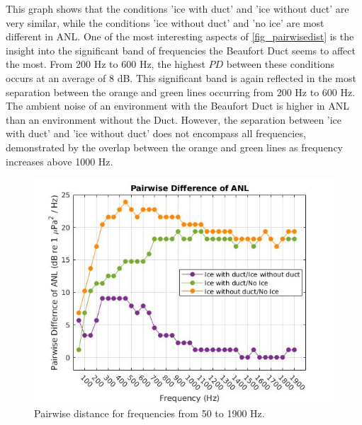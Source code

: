 This graph shows that the conditions 'ice with duct' and 'ice without duct' are very similar, while the conditions 'ice without duct' and 'no ice' are most different in ANL. One of the most interesting aspects of \autoref{fig_pairwisedist} is the insight into the significant band of frequencies the Beaufort Duct seems to affect the most. From 200 Hz to 600 Hz, the highest $PD$ between these conditions occurs at an average of 8 dB. This significant band is again reflected in the most separation between the orange and green lines occurring from 200 Hz to 600 Hz. The ambient noise of an environment with the Beaufort Duct is higher in ANL than an environment without the Duct. However, the separation between 'ice with duct' and 'ice without duct' does not encompass all frequencies, demonstrated by the overlap between the orange and green lines as frequency increases above 1000 Hz.

\begin{figure}[p]
\centering
\includegraphics[scale=0.6]{Figures/recolor_pairwise_dist_ANLs2.jpg}
\caption{Pairwise distance for frequencies from 50 to 1900 Hz.}
\label{fig_pairwisedist}
\end{figure}


